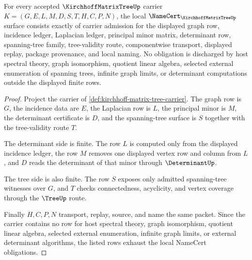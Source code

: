 \begin{theorem}
\label{thm:kirchhoff-matrix-tree-namecert-obligations}
For every accepted $\KirchhoffMatrixTreeUp$ carrier $K=(G,E,L,M,D,S,T,H,C,P,N)$, the local $\NameCert_{\KirchhoffMatrixTreeUp}$ surface consists exactly of carrier admission for the displayed graph row, incidence ledger, Laplacian ledger, principal minor matrix, determinant row, spanning-tree family, tree-validity route, componentwise transport, displayed replay, package provenance, and local naming. No obligation is discharged by host spectral theory, graph isomorphism, quotient linear algebra, selected external enumeration of spanning trees, infinite graph limits, or determinant computations outside the displayed finite rows.
\end{theorem}
\begin{proof}
Project the carrier of \autoref{def:kirchhoff-matrix-tree-carrier}. The graph row is $G$, the incidence data are $E$, the Laplacian row is $L$, the principal minor is $M$, the determinant certificate is $D$, and the spanning-tree surface is $S$ together with the tree-validity route $T$.

The determinant side is finite. The row $L$ is computed only from the displayed incidence ledger, the row $M$ removes one displayed vertex row and column from $L$, and $D$ reads the determinant of that minor through $\DeterminantUp$.

The tree side is also finite. The row $S$ exposes only admitted spanning-tree witnesses over $G$, and $T$ checks connectedness, acyclicity, and vertex coverage through the $\TreeUp$ route.

Finally $H,C,P,N$ transport, replay, source, and name the same packet. Since the carrier contains no row for host spectral theory, graph isomorphism, quotient linear algebra, selected external enumeration, infinite graph limits, or external determinant algorithms, the listed rows exhaust the local NameCert obligations.
\end{proof}

